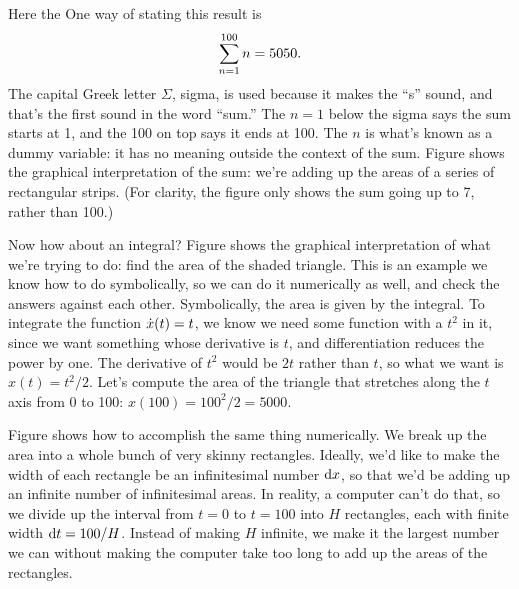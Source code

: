 \begin{Code}
  \ii %
\end{Code}

Here the \verb@%@ symbol is the computer's prompt. The result is 5,050, as expected.
One way of stating this result is
\begin{equation*}
  \sum_{n=1}^{100} n = 5050.
\end{equation*}
The capital Greek letter $\Sigma$, sigma, is used because it makes the ``s'' sound, and
that's the first sound in the word ``sum.'' The $n=1$ below the sigma says the sum starts
at 1, and the 100 on top says it ends at 100. The $n$ is what's known as a dummy variable:
it has no meaning outside the context of the sum. Figure  shows the
graphical interpretation of the sum: we're adding up the areas of a series of rectangular
strips. (For clarity, the figure only shows the sum going up to 7, rather than 100.)


Now how about an integral? Figure  shows the graphical interpretation
of what we're trying to do: find the area of the shaded triangle.
This is an example we know how to do symbolically, so we can do it numerically as well,
and check the answers against each other. Symbolically, the area is given by the integral.
To integrate the function $\dot{x}(t)=t$, we know we need some function with a $t^2$ in it,
since we want something whose derivative is $t$, and differentiation reduces the power
by one. The derivative of $t^2$ would be $2t$ rather than $t$, so what we want is
$x(t)=t^2/2$. Let's compute the area of the triangle that stretches along the $t$ axis
from 0 to 100: $x(100)=100^2/2=5000$.


Figure  shows how to accomplish the same thing numerically. We break up the area
into a whole bunch of very skinny rectangles. Ideally, we'd like to make the width of each
rectangle be an infinitesimal number $\operatorname{d\!} x$, so that we'd be adding up an infinite number of
infinitesimal areas. In reality, a computer can't do that, so we divide up the interval from
$t=0$ to $t=100$ into $H$ rectangles, each with finite width $\operatorname{d\!} t=100/H$. Instead of making
$H$ infinite, we make it the largest number we can without making the computer take too
long to add up the areas of the rectangles.

